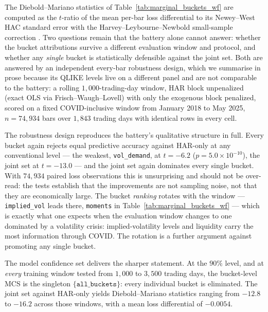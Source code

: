 The Diebold--Mariano statistics of Table~\ref{tab:marginal_buckets_wf}
\citep{DieboldMariano1995} are computed as the $t$-ratio of the mean per-bar loss
differential to its Newey--West HAC standard error with the Harvey--Leybourne--Newbold
small-sample correction \citep{HarveyLeybourneNewbold1997}. Two questions remain that the
battery alone cannot answer: whether the bucket attributions survive a different
evaluation window and protocol, and whether any \emph{single} bucket is statistically
defensible against the joint set. Both are answered by an independent every-bar
robustness design, which we summarise in prose because its QLIKE levels live on a
different panel and are not comparable to the battery: a rolling
$1{,}000$-trading-day window, HAR block unpenalized (exact OLS via Frisch--Waugh--Lovell)
with only the exogenous block penalized, scored on a fixed COVID-inclusive window from
January 2018 to May 2025, $n = 74{,}934$ bars over $1{,}843$ trading days with identical
rows in every cell.

The robustness design reproduces the battery's qualitative structure in full. Every
bucket again rejects equal predictive accuracy against HAR-only at any conventional
level --- the weakest, \texttt{vol\_demand}, at $t = -6.2$
($p = 5.0 \times 10^{-10}$), the joint set at $t = -13.0$ --- and the joint set again
dominates every single bucket. With $74{,}934$ paired loss observations this is
unsurprising and should not be over-read: the tests establish that the improvements are
not sampling noise, not that they are economically large. The bucket \emph{ranking}
rotates with the window --- \texttt{implied\_vol} leads there, \texttt{moments} in
Table~\ref{tab:marginal_buckets_wf} --- which is exactly what one expects when the
evaluation window changes to one dominated by a volatility crisis: implied-volatility
levels and liquidity carry the most information through COVID. The rotation is a further
argument against promoting any single bucket.

The model confidence set delivers the sharper statement. At the $90\%$ level, and at
\emph{every} training window tested from $1{,}000$ to $3{,}500$ trading days, the
bucket-level MCS is the singleton $\{\texttt{all\_buckets}\}$: every individual bucket is
eliminated. The joint set against HAR-only yields Diebold--Mariano statistics ranging from
$-12.8$ to $-16.2$ across those windows, with a mean loss differential of $-0.0054$.

